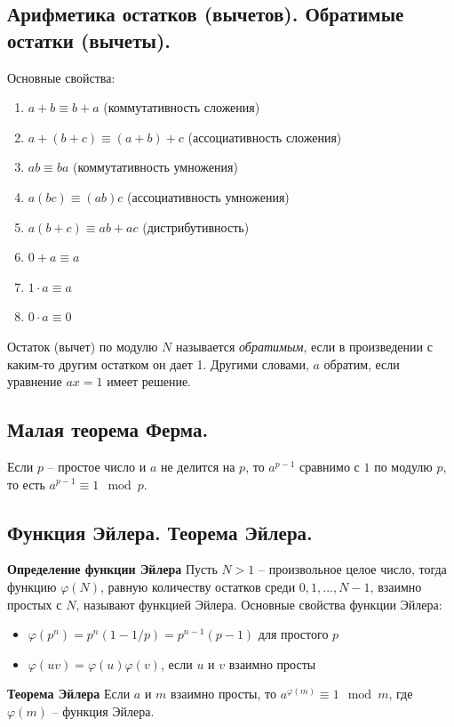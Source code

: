 \begin{samepage}
\subsection{Арифметика остатков (вычетов). Обратимые остатки (вычеты).} 
Основные свойства:
\begin{enumerate}
    \item $a + b \equiv b + a$ (коммутативность сложения)
    \item $a + (b + c) \equiv (a + b) + c$ (ассоциативность сложения)
    \item $ab \equiv ba$ (коммутативность умножения)
    \item $a(bc) \equiv (ab)c$ (ассоциативность умножения)
    \item $a(b + c) \equiv ab + ac$ (дистрибутивность)
    \item $0+a \equiv a$
    \item $1 \cdot a \equiv a$
    \item $0 \cdot a \equiv 0$
\end{enumerate}
Остаток (вычет) по модулю $N$ называется \textit{обратимым}, если в произведении с каким-то другим остатком он дает 1. Другими словами, $a$ обратим, если уравнение $ax = 1$  имеет решение.
\end{samepage}
\subsection{Малая теорема Ферма.}
Если $p$ -- простое число и $a$ не делится на $p$, то $a^{p-1}$ сравнимо с $1$ по модулю $p$, то есть $a^{p-1} \equiv 1 \mod{p}$.


\subsection{Функция Эйлера. Теорема Эйлера.}
\textbf{Определение функции Эйлера} \newline
Пусть $N > 1$ -- произвольное целое число, тогда функцию $\varphi(N)$, равную количеству остатков среди $0,1,...,N-1$, взаимно простых с $N$, называют функцией Эйлера.
\newline
Основные свойства функции Эйлера:
\begin{itemize}
    \item $\varphi(p^n) = p^n(1-1/p) = p^{n-1}(p - 1)$ для простого $p$
    \item $\varphi(uv) = \varphi(u)\varphi(v)$, если $u$ и $v$ взаимно просты
\end{itemize}
\textbf{Теорема Эйлера} \newline
Если $a$ и $m$ взаимно просты, то $a^{\varphi(m)} \equiv 1 \mod{m}$, где $\varphi(m)$ -- функция Эйлера.

